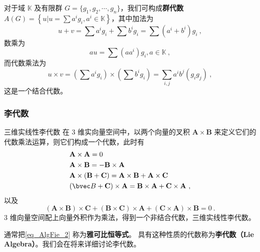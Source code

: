 \begin{example}{}
对于域 $\mathbb{K} $ 及有限群 $G=\{g_1,g_2,\cdots,g_n\}$，我们可构成\textbf{群代数}$\displaystyle A(G)=\left\{u | u=\sum a^{i} g_{i}, a^{i} \in \mathbb{K}\right\}$，其中加法为
\begin{equation}
u+v=\sum a^{i} g_{i}+\sum b^{i} g_{i}=\sum\left(a^{i}+b^{i}\right) g_{i}~,
\end{equation}
数乘为
\begin{equation}\label{eq_AlgFie_2}
a u=\sum\left(a a^{i}\right) g_{i}, a \in \mathbb{K}~,
\end{equation}
而代数乘法为
\begin{equation}
u \times v=\left(\sum a^{i} g_{i}\right) \times\left(\sum b^{i} g_{i}\right)=\sum_{i, j} a^{i} b^{j}\left(g_{i} g_{j}\right)~,
\end{equation}
这是一个结合代数。
\end{example}

\subsubsection{李代数}

\begin{example}{三维实线性李代数}
在 $3$ 维实向量空间中，以两个向量的叉积 $\mathbf A\times \mathbf B$ 来定义它们的代数乘法运算，则它们构成一个代数，此时有
\begin{equation}
\begin{aligned}
&\mathbf{A} \times \mathbf{A}=0\\
&\mathbf{A} \times \mathbf{B}=-\mathbf{B} \times \mathbf{A}\\
&\mathbf{A} \times(\mathbf{B}+\mathbf{C})=\mathbf{A} \times \mathbf{B}+\mathbf{A} \times \mathbf{C}\\
&(\bvec B+\mathbf{C}) \times \mathbf{A}=\mathbf{B} \times \mathbf{A}+\mathbf{C} \times \mathbf{A}~,
\end{aligned}
\end{equation}
以及
\begin{equation} \label{eq_AlgFie_1}
(\mathbf{A} \times \mathbf{B}) \times \mathbf{C}+(\mathbf{B} \times \mathbf{C}) \times \mathbf{A}+(\mathbf{C} \times \mathbf{A}) \times \mathbf{B}=0~.
\end{equation}
$3$ 维向量空间配上向量外积作为乘法，得到一个非结合代数，三维实线性李代数。
\end{example}

通常把\autoref{eq_AlgFie_2}  称为\textbf{雅可比恒等式}。 具有这种性质的代数称为\textbf{李代数（Lie Algebra）}。我们会在将来详细讨论李代数。

